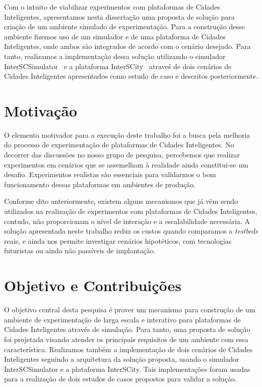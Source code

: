 Com o intuito de viabilizar experimentos com plataformas de Cidades Inteligentes, apresentamos nesta dissertação uma proposta de solução para criação de um ambiente simulado de experimentação.
Para a construção desse ambiente fizemos uso de um simulador e de uma plataforma de Cidades Inteligentes, onde ambos são integrados de acordo com o cenário desejado.
Para tanto, realizamos a implementação dessa solução utilizando o simulador InterSCSimulator~\cite{santana_17} e a plataforma InterSCity~\cite{arthur_17} atraveś de dois cenários de Cidades Inteligentes
apresentados como estudo de caso e descritos posteriormente.

\section{Motivação}

O elemento motivador para a execução deste trabalho foi a busca pela melhoria do processo de experimentação de plataformas de Cidades Inteligentes.
No decorrer das discussões no nosso grupo de pesquisa, percebemos que realizar experimentos em cenários que se assemelham à realidade ainda constitui-se um desafio.
Experimentos realistas são essenciais para validarmos o bom funcionamento dessas plataformas em ambientes de produção.

Conforme dito anteriormente, existem alguns mecanismos que já vêm sendo utilizados na realização de experimentos com plataformas de Cidades Inteligentes, contudo, não proporcionam o nível de interação
e a escalabilidade necessária.
A solução apresentada neste trabalho reduz os custos quando comparamos a \textit{testbeds} reais, e ainda nos permite investigar cenários hipotéticos, com tecnologias futuristas ou ainda não
passíveis de implantação.

\section{Objetivo e Contribuições}

O objetivo central desta pesquisa é prover um mecanismo para construção de um ambiente de experimentação de larga escala e interativo para plataformas de Cidades Inteligentes através de simulação.
Para tanto, uma proposta de solução foi projetada visando atender os principais requisitos de um ambiente com essa característica.
Realizamos também a implementação de dois cenários de Cidades Inteligentes seguindo a arquitetura da solução proposta, usando o simulador InterSCSimulator e a plataforma InterSCity.
Tais implementações foram usadas para a realização de dois estudos de casos propostos para validar a solução.

